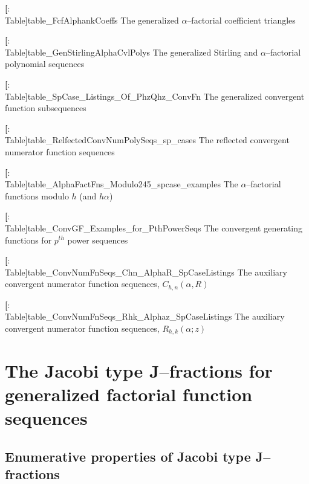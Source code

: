 \documentclass[12pt,reqno]{article}
\numberwithin{sfootnote}{section}
\numberwithin{equation}{section}
\newcommand{\itemlabel}[1]{\textbf{#1}: \\ }
\theoremstyle{plain}
\theoremstyle{definition}
\theoremstyle{remark}
\begin{document}
\begin{enumerate}[leftmargin=\parindent,itemsep=-1mm]
\begin{enumerate}[leftmargin=\parindent,itemsep=-1mm]
\itemlabel[Table]{table_FcfAlphankCoeffs}{
     The generalized $\alpha$--factorial coefficient triangles} 

\itemlabel[Table]{table_GenStirlingAlphaCvlPolys}{ 
     The generalized Stirling and 
     $\alpha$--factorial polynomial sequences} 

\itemlabel[Table]{table_SpCase_Listings_Of_PhzQhz_ConvFn}{
     The generalized convergent function subsequences} 

\itemlabel[Table]{table_RelfectedConvNumPolySeqs_sp_cases}{
     The reflected convergent numerator function sequences} 

\itemlabel[Table]{table_AlphaFactFns_Modulo245_spcase_examples}{
     The $\alpha$--factorial functions modulo $h$ (and $h\alpha$)} 

\itemlabel[Table]{table_ConvGF_Examples_for_PthPowerSeqs}{
     The convergent generating functions for 
     $p^{th}$ power sequences} 

\itemlabel[Table]{table_ConvNumFnSeqs_Chn_AlphaR_SpCaseListings}{
     The auxiliary convergent numerator function sequences, 
     $C_{h,n}(\alpha, R)$} 

\itemlabel[Table]{table_ConvNumFnSeqs_Rhk_Alphaz_SpCaseListings}{
     The auxiliary convergent numerator function sequences, 
     $R_{h,k}(\alpha; z)$} 

\end{enumerate} 

\end{enumerate} 

\section{The Jacobi type J--fractions for 
         generalized factorial function sequences} 
\label{Section_Proofs_of_the_GenCFracReps} 

\subsection{Enumerative properties of 
            Jacobi type J--fractions}
\label{subSection_EnumProps_of_JFractions} 
\end{document}
